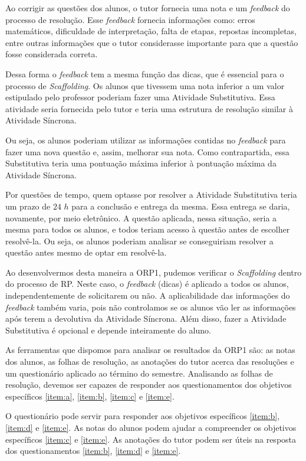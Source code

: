 Ao corrigir as questões dos alunos, o tutor fornecia uma nota e um \textit{feedback} do processo de resolução. Esse \textit{feedback} fornecia informações como: erros matemáticos, dificuldade de interpretação, falta de etapas, repostas incompletas, entre outras informações que o tutor considerasse importante para que a questão fosse considerada correta.

Dessa forma o \textit{feedback} tem a mesma função das dicas, que é essencial para o processo de \textit{Scaffolding}. Os alunos que tivessem uma nota inferior a um valor estipulado pelo professor poderiam fazer uma Atividade Substitutiva. Essa atividade seria fornecida pelo tutor e teria uma estrutura de resolução similar à Atividade Síncrona.

Ou seja, os alunos poderiam utilizar as informações contidas no \textit{feedback} para fazer uma nova questão e, assim, melhorar sua nota. Como contrapartida, essa Substitutiva teria uma pontuação máxima inferior à pontuação máxima da Atividade Síncrona.

Por questões de tempo, quem optasse por resolver a Atividade Substitutiva teria um prazo de $24$ $h$ para a conclusão e entrega da mesma. Essa entrega se daria, novamente, por meio eletrônico. A questão aplicada, nessa situação, seria a mesma para todos os alunos, e todos teriam acesso à questão antes de escolher resolvê-la. Ou seja, os alunos poderiam analisar se conseguiriam resolver a questão antes mesmo de optar em resolvê-la.

Ao desenvolvermos desta maneira a ORP1, pudemos verificar o \textit{Scaffolding} dentro do processo de RP. Neste caso, o \textit{feedback} (dicas) é aplicado a todos os alunos, independentemente de solicitarem ou não. A aplicabilidade das informações do \textit{feedback} também varia, pois não controlamos se os alunos vão ler as informações após terem a devolutiva da Atividade Síncrona. Além disso, fazer a Atividade Substitutiva é opcional e depende inteiramente do aluno.

As ferramentas que dispomos para analisar os resultados da ORP1 são: as notas dos alunos, as folhas de resolução, as anotações do tutor acerca das resoluções e um questionário aplicado ao término do semestre. Analisando as folhas de resolução, devemos ser capazes de responder aos questionamentos dos objetivos específicos \ref{item:a}, \ref{item:b}, \ref{item:c} e \ref{item:e}.

O questionário pode servir para responder aos objetivos específicos \ref{item:b}, \ref{item:d} e \ref{item:e}. As notas do alunos podem ajudar a compreender os objetivos específicos \ref{item:c} e \ref{item:e}. As anotações do tutor podem ser úteis na resposta dos questionamentos \ref{item:b}, \ref{item:d} e \ref{item:e}.

